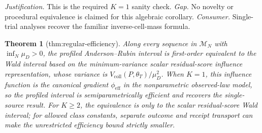 \documentclass{article}
\newtheorem{theorem}{Theorem}
\begin{document}
\par\smallskip\noindent \textit{Justification.} This is the required \(K=1\) sanity check. \textit{Gap.} No novelty or procedural equivalence is claimed for this algebraic corollary. \textit{Consumer.} Single-trial analyses recover the familiar inverse-cell-mass formula.

\begin{theorem}[thm:regular-efficiency]\label{thm:regular-efficiency}
Along every sequence in \(\mathcal M_N\) with \(\inf_N\mu_D>0\), the profiled Anderson--Rubin interval is first-order equivalent to the Wald interval based on the minimum-variance scalar residual-score influence representation, whose variance is \(V_{\mathrm{coll}}(P,\theta_T)/\mu_D^2\). When \(K=1\), this influence function is the canonical gradient \(\phi_{\mathrm{eff}}\) in the nonparametric observed-law model, so the profiled interval is semiparametrically efficient and recovers the single-source result. For \(K\ge2\), the equivalence is only to the scalar residual-score Wald interval; for allowed class constants, separate outcome and receipt transport can make the unrestricted efficiency bound strictly smaller.
\end{theorem}
\end{document}
